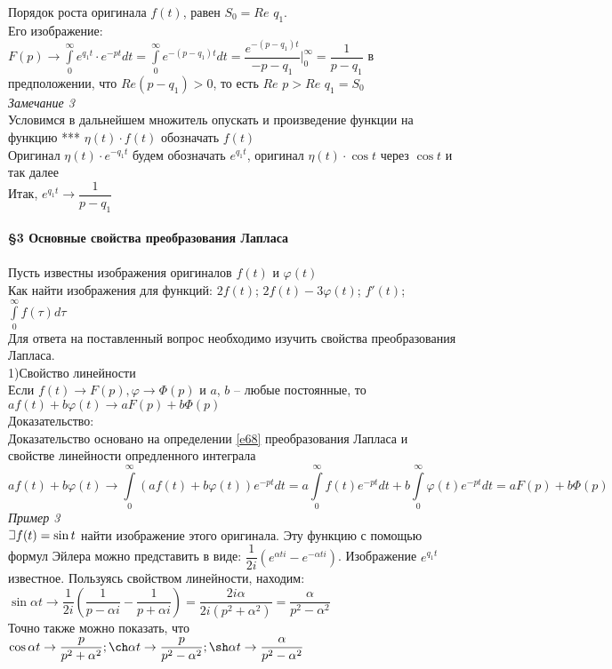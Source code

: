 \documentclass{article}
\numberwithin{equation}{section}
\def\letus{%
    \mathord{\setbox0=\hbox{$\exists$}%
             \hbox{\kern 0.125\wd0%
                   \vbox to \ht0{%
                      \hrule width 0.75\wd0%
                      \vfill%
                      \hrule width 0.75\wd0}%
                   \vrule height \ht0%
                   \kern 0.125\wd0}%
           }%
}
\begin{document}
Порядок роста оригинала $f(t)$, равен $S_0=Re$ $q_1$.\\
Его изображение: $F(p)\rightarrow\int\limits_0^\infty e^{q_1t}\cdot e^{-pt}dt=\int\limits_0^\infty e^{-(p-q_1)t}dt=\dfrac{e^{-(p-q_1)t}}{-{p-q_1}}\Big|_0^\infty=\dfrac{1}{p-q_1}$ в предположении, что $Re(p-q_1)>0$, то есть $Re$ $p>Re$ $q_1=S_0$\\
\textit{Замечание 3}\\
Условимся в дальнейшем множитель опускать и произведение функции на функцию \colorbox{red!50}{***} $\eta(t)\cdot f(t)$ обозначать $f(t)$\\
Оригинал $\eta(t)\cdot e^{-q_1t}$ будем обозначать $e^{q_1t}$, оригинал $\eta(t)\cdot\cos t$ через $\cos t$ и так далее\\
Итак, $e^{q_1t}\rightarrow\dfrac{1}{p-q_1}$
\\\\
\textbf{\large{\S3 Основные свойства преобразования Лапласа}}
\\\\
Пусть известны изображения оригиналов $f(t)$ и $\varphi(t)$\\
Как найти изображения для функций: $2f(t)$; $2f(t)-3\varphi(t)$; $f'(t)$; $\int\limits_0^\infty f(\tau)d\tau$\\
Для ответа на поставленный вопрос необходимо изучить свойства преобразования Лапласа.\\
1)Свойство линейности\\
Если $f(t)\rightarrow F(p),\varphi\rightarrow\varPhi(p)$ и $a$, $b$ -- любые постоянные, то $af(t)+b\varphi(t)\rightarrow aF(p)+b\varPhi(p)$\\
Доказательство:\\
Доказательство основано на определении \eqref{e68} преобразования Лапласа и свойстве линейности опредленного интеграла
$$af(t)+b\varphi(t)\rightarrow\int\limits_0^\infty(af(t)+b\varphi(t))e^{-pt}dt=a\int\limits_0^\infty f(t)e^{-pt}dt+b\int\limits_0^\infty\varphi(t)e^{-pt}dt=aF(p)+b\varPhi(p)$$
\textit{Пример 3}\\
$\letus f(t)=\sin t$ найти изображение этого оригинала. Эту функцию с помощью формул Эйлера можно представить в виде: $\dfrac{1}{2i}(e^{\alpha ti}-e^{-\alpha ti})$. Изображение $e^{q_1t}$ известное. Пользуясь свойством линейности, находим: $\sin\alpha t\rightarrow\dfrac{1}{2i}(\dfrac{1}{p-\alpha i}-\dfrac{1}{p+\alpha i})=\dfrac{2i\alpha}{2i(p^2+\alpha^2)}=\dfrac{\alpha}{p^2-\alpha^2}$\\
Точно также можно показать, что $\cos\alpha t\rightarrow\dfrac{p}{p^2+\alpha^2};\ch\alpha t\rightarrow\dfrac{p}{p^2-\alpha^2};\sh\alpha t\rightarrow\dfrac{\alpha}{p^2-\alpha^2}$\\
\end{document}
